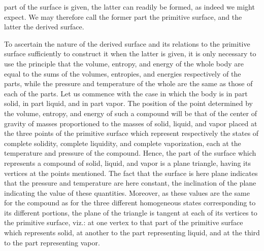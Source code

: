 \documentclass[11pt]{article}
\begin{document}
part of the surface is given, the latter can readily be formed, as indeed we might expect. We may therefore call the former part the primitive surface, and the latter the derived surface.

To ascertain the nature of the derived surface and its relations to the primitive surface sufficiently to construct it when the latter is given, it is only necessary to use the principle that the volume, entropy, and energy of the whole body are equal to the sums of the volumes, entropies, and energies respectively of the parts, while the pressure and temperature of the whole are the same as those of each of the parts. Let us commence with the case in which the body is in part solid, in part liquid, and in part vapor. The position of the point determined by the volume, entropy, and energy of such a compound will be that of the center of gravity of masses proportioned to the masses of solid, liquid, and vapor placed at the three points of the primitive surface which represent respectively the states of complete solidity, complete liquidity, and complete vaporization, each at the temperature and pressure of the compound. Hence, the part of the surface which represents a compound of solid, liquid, and vapor is a plane triangle, having its vertices at the points mentioned. The fact that the surface is here plane indicates that the pressure and temperature are here constant, the inclination of the plane indicating the value of these quantities. Moreover, as these values are the same for the compound as for the three different homogeneous states corresponding to its different portions, the plane of the triangle is tangent at each of its vertices to the primitive surface, viz.: at one vertex to that part of the primitive surface which represents solid, at another to the part representing liquid, and at the third to the part representing vapor.
\end{document}
